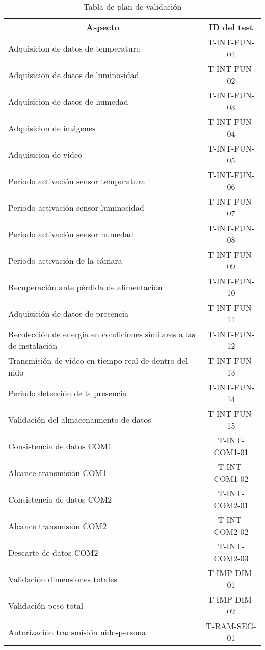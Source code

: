 \begin{table}[H]
\centering
\begin{tabular}{|l|c|}
\hline
\multicolumn{1}{|c|}{Aspecto}          & ID del test   \\ \hline
Adquisicion de datos de temperatura    & T-INT-FUN-01  \\ \hline
Adquisicion de datos de luminosidad    & T-INT-FUN-02  \\ \hline
Adquisicion de datos de humedad        & T-INT-FUN-03  \\ \hline
Adquisicion de imágenes                & T-INT-FUN-04  \\ \hline
Adquisicion de video                   & T-INT-FUN-05  \\ \hline
Periodo activación sensor temperatura  & T-INT-FUN-06  \\ \hline
Periodo activación sensor luminosidad  & T-INT-FUN-07  \\ \hline
Periodo activación sensor humedad      & T-INT-FUN-08  \\ \hline
Periodo activación de la cámara        & T-INT-FUN-09  \\ \hline
Recuperación ante pérdida de alimentación                            & T-INT-FUN-10 \\ \hline
Adquisición de datos de presencia      & T-INT-FUN-11  \\ \hline
Recolección de energía en condiciones similares a las de instalación & T-INT-FUN-12 \\ \hline
Transmisión de video en tiempo real de dentro del nido               & T-INT-FUN-13 \\ \hline
Periodo detección de la presencia      & T-INT-FUN-14  \\ \hline
Validación del almacenamiento de datos & T-INT-FUN-15  \\ \hline
Consistencia de datos COM1             & T-INT-COM1-01 \\ \hline
Alcance transmisión COM1               & T-INT-COM1-02 \\ \hline
Consistencia de datos COM2             & T-INT-COM2-01 \\ \hline
Alcance transmisión COM2               & T-INT-COM2-02 \\ \hline
Descarte de datos COM2                 & T-INT-COM2-03 \\ \hline
Validación dimensiones totales         & T-IMP-DIM-01  \\ \hline
Validación peso total                  & T-IMP-DIM-02  \\ \hline
Autorización transmisión nido-persona  & T-RAM-SEG-01  \\ \hline
\end{tabular}
\caption{Tabla de plan de validación}
\end{table}